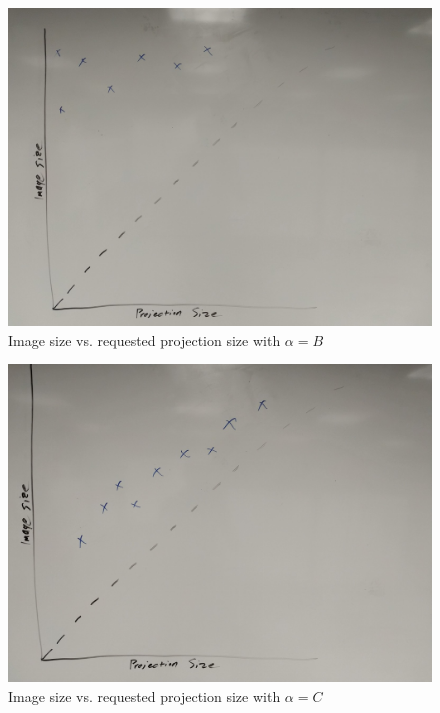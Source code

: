 \documentclass[conference]{IEEEtran}
\begin{document}
\begin{figure}
\includegraphics[width=\linewidth]{plots/IMG_20181116_102623.jpg}
\caption{Image size vs. requested projection size with $\alpha=B$}
\end{figure}

\begin{figure}
\includegraphics[width=\linewidth]{plots/IMG_20181116_102706.jpg}
\caption{Image size vs. requested projection size with $\alpha=C$}
\end{figure}
\end{document}
